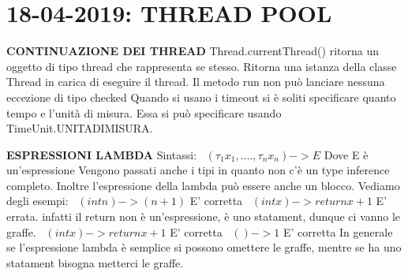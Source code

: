 

\newpage
\section{18-04-2019: THREAD POOL}
\noindent \textbf{CONTINUAZIONE DEI THREAD} \newline
Thread.currentThread() ritorna un oggetto di tipo thread che rappresenta se stesso. Ritorna una istanza della classe Thread in carica di eseguire il thread. \newline
Il metodo run non può lanciare nessuna eccezione di tipo checked \newline
Quando si usano i timeout si è soliti specificare quanto tempo e l'unità di misura. Essa si può specificare usando TimeUnit.UNITADIMISURA. \newline

\noindent \textbf{ESPRESSIONI LAMBDA} \newline
Sintassi: \newline
\textbullet\ $ (\tau_{1} x_{1} , .... , \tau_{n} x_{n}) -> E $ Dove E è un'espressione \newline
Vengono passati anche i tipi in quanto non c'è un type inference completo. Inoltre l'espressione della lambda può essere anche un blocco. \newline
Vediamo degli esempi: \newline
\textbullet\ $ (int n) -> (n+1) $ E' corretta \newline
\textbullet\ $ (int x) -> return x+1 $ E' errata. infatti il return non è un'espressione, è uno statament, dunque ci vanno le graffe. \newline
\textbullet\ $ (int x) -> {return x+1} $ E' corretta \newline
\textbullet\ $ () -> 1 $ E' corretta \newline
In generale se l'espressione lambda è semplice si possono omettere le graffe, mentre se ha uno statament bisogna metterci le graffe. \newline



